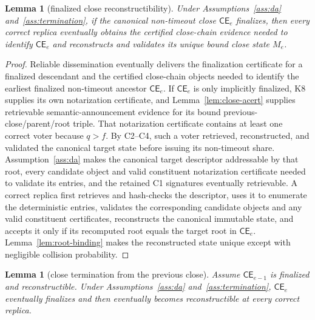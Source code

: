 \documentclass[11pt]{article}
\newtheorem{lemma}[theorem]{Lemma}
\theoremstyle{definition}
\theoremstyle{remark}
\newcommand{\CE}{\mathsf{CE}}
\begin{document}
\begin{lemma}[finalized close reconstructibility]
\label{lem:close-reconstruct}
Under Assumptions~\ref{ass:da} and~\ref{ass:termination}, if the canonical non-timeout close $\CE_e$ finalizes, then every correct replica eventually obtains the certified close-chain evidence needed to identify $\CE_e$ and reconstructs and validates its unique bound close state $M_e$.
\end{lemma}

\begin{proof}
Reliable dissemination eventually delivers the finalization certificate for a finalized descendant and the certified close-chain objects needed to identify the earliest finalized non-timeout ancestor $\CE_e$. If $\CE_e$ is only implicitly finalized, K8 supplies its own notarization certificate, and Lemma~\ref{lem:close-acert} supplies retrievable semantic-announcement evidence for its bound previous-close/parent/root triple. That notarization certificate contains at least one correct voter because $q>f$. By C2--C4, such a voter retrieved, reconstructed, and validated the canonical target state before issuing its non-timeout share. Assumption~\ref{ass:da} makes the canonical target descriptor addressable by that root, every candidate object and valid constituent notarization certificate needed to validate its entries, and the retained C1 signatures eventually retrievable. A correct replica first retrieves and hash-checks the descriptor, uses it to enumerate the deterministic entries, validates the corresponding candidate objects and any valid constituent certificates, reconstructs the canonical immutable state, and accepts it only if its recomputed root equals the target root in $\CE_e$. Lemma~\ref{lem:root-binding} makes the reconstructed state unique except with negligible collision probability.
\end{proof}

\begin{lemma}[close termination from the previous close]
\label{lem:close-from-prev}
Assume $\CE_{e-1}$ is finalized and reconstructible. Under Assumptions~\ref{ass:da} and~\ref{ass:termination}, $\CE_e$ eventually finalizes and then eventually becomes reconstructible at every correct replica.
\end{lemma}
\end{document}
